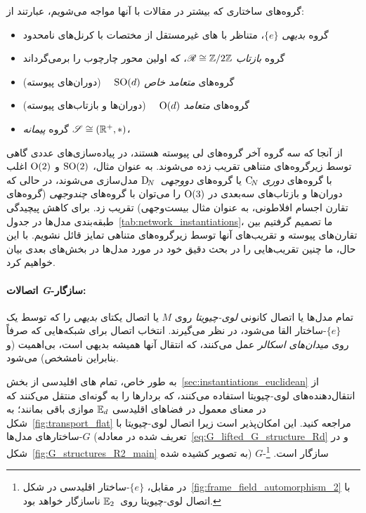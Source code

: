 گروه‌های ساختاری که بیشتر در مقالات با آنها مواجه می‌شویم، عبارتند از:
\begin{itemize}
	\item[{\rule[2.0pt]{2pt}{2pt}}]
	گروه \emph{بدیهی} $\{e\}$، متناظر با \CNN های غیرمستقل از مختصات با کرنل‌های نامحدود
	\item[{\rule[2.0pt]{2pt}{2pt}}]
	گروه \emph{بازتاب} $\mathscr{R} \cong \mathbb{Z}/2\mathbb{Z}$، که اولین محور چارچوب را برمی‌گرداند
	\item[{\rule[2.0pt]{2pt}{2pt}}]
	گروه‌های \emph{متعامد خاص} $\operatorname{SO}(d)$
	\ \ (دوران‌های پیوسته)
	\item[{\rule[2.0pt]{2pt}{2pt}}]
	گروه‌های \emph{متعامد} $\operatorname{O}(d)$
	\ \ (دوران‌ها و بازتاب‌های پیوسته)
	\item[{\rule[2.0pt]{2pt}{2pt}}]
	گروه \emph{پیمانه} $\mathscr{S} \cong (\mathbb{R}^+,*)$،
\end{itemize}
از آنجا که سه گروه آخر گروه‌های لی پیوسته هستند، در پیاده‌سازی‌های عددی گاهی توسط زیرگروه‌های متناهی تقریب زده می‌شوند.
به عنوان مثال، $\operatorname{SO}(2)$ و $\operatorname{O}(2)$ اغلب با گروه‌های \emph{دوری} $\operatorname{C}_{\!N}$ یا گروه‌های \emph{دووجهی}~$\operatorname{D}_{\!N}$ مدل‌سازی می‌شوند، در حالی که دوران‌ها و بازتاب‌های سه‌بعدی در $\operatorname{O}(3)$ را می‌توان با گروه‌های \emph{چندوجهی} (گروه‌های تقارن اجسام افلاطونی، به عنوان مثال بیست‌وجهی) تقریب زد.
برای کاهش پیچیدگی طبقه‌بندی مدل‌ها در جدول~\ref{tab:network_instantiations}، ما تصمیم گرفتیم بین تقارن‌های پیوسته و تقریب‌های آنها توسط زیرگروه‌های متناهی تمایز قائل نشویم.
با این حال، ما چنین تقریب‌هایی را در بحث دقیق خود در مورد مدل‌ها در بخش‌های بعدی بیان خواهیم کرد.

\paragraph{اتصالات \textit{G}-سازگار:}
تمام مدل‌ها یا اتصال کانونی \emph{لوی-چیویتا} روی $M$ یا اتصال یکتای \emph{بدیهی} را که توسط یک $\{e\}$-ساختار القا می‌شود، در نظر می‌گیرند.
انتخاب اتصال برای شبکه‌هایی که صرفاً روی \emph{میدان‌های اسکالر} عمل می‌کنند، که انتقال آنها همیشه بدیهی است، بی‌اهمیت (و بنابراین نامشخص) می‌شود.

به طور خاص، تمام \CNN های اقلیدسی از بخش~\ref{sec:instantiations_euclidean} از انتقال‌دهنده‌های لوی-چیویتا استفاده می‌کنند، که بردارها را به گونه‌ای منتقل می‌کنند که در معنای معمول در فضاهای اقلیدسی $\mathbb{E}_d$ موازی باقی بمانند؛ به شکل~\ref{fig:transport_flat} مراجعه کنید.
این امکان‌پذیر است زیرا اتصال لوی-چیویتا با $G$-ساختارهای مدل‌ها (تعریف شده در معادله~\eqref{eq:G_lifted_G_structure_Rd} و در شکل~\ref{fig:G_structures_R2_main} به تصویر کشیده شده) $G$-سازگار است.%
\footnote{
	در مقابل، $\{e\}$-ساختار اقلیدسی در شکل~\ref{fig:frame_field_automorphism_2} با اتصال لوی-چیویتا روی~$\mathbb{E}_2$ ناسازگار خواهد بود.
}

